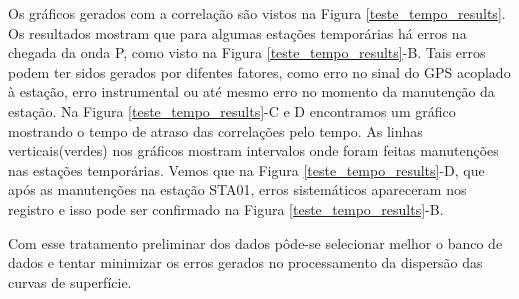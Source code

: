 Os gráficos gerados com a correlação são vistos na Figura \ref{teste_tempo_results}. Os resultados mostram que para algumas estações temporárias há erros na chegada da onda P, como visto na Figura \ref{teste_tempo_results}-B. Tais erros podem ter sidos gerados por difentes fatores, como erro no sinal do GPS acoplado à estação, erro instrumental ou até mesmo erro no momento da manutenção da estação. Na Figura \ref{teste_tempo_results}-C e D encontramos um gráfico mostrando o tempo de atraso das correlações pelo tempo. As linhas verticais(verdes) nos gráficos mostram intervalos onde foram feitas manutenções nas estações temporárias. Vemos que na Figura \ref{teste_tempo_results}-D, que após as manutenções na estação STA01, erros sistemáticos apareceram nos registro e isso pode ser confirmado na Figura \ref{teste_tempo_results}-B.

Com esse tratamento preliminar dos dados pôde-se selecionar melhor o banco de dados e tentar minimizar os erros gerados no processamento da dispersão das curvas de superfície. 
